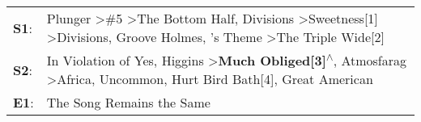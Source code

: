 \begin{supertabular}{p{0.03\textwidth}p{0.92\textwidth}}
 \textbf{S1}:  &  Plunger\textsuperscript{} \textgreater \enspace \#5\textsuperscript{} \textgreater \enspace The Bottom Half\textsuperscript{}, \enspace Divisions\textsuperscript{} \textgreater \enspace Sweetness[1]\textsuperscript{} \textgreater \enspace Divisions\textsuperscript{}, \enspace Groove Holmes\textsuperscript{}, 's Theme\textsuperscript{} \textgreater \enspace The Triple Wide[2]\textsuperscript{}  \enspace  \\
 \textbf{S2}:  &                                                  In Violation of Yes\textsuperscript{}, \enspace Higgins\textsuperscript{} \textgreater \enspace \textbf{Much Obliged[3]\textsuperscript{$\wedge$}}, \enspace Atmosfarag\textsuperscript{} \textgreater \enspace Africa\textsuperscript{}, \enspace Uncommon\textsuperscript{}, \enspace Hurt Bird Bath[4]\textsuperscript{}, \enspace Great American\textsuperscript{}  \enspace  \\
 \textbf{E1}:  &                                                                                                                                                                                                                                                                                                                                                                             The Song Remains the Same\textsuperscript{}  \enspace  \\
\end{supertabular}
